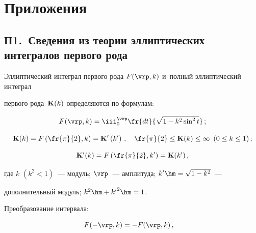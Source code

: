 {\small



\section*{\raggedleft Приложения}





\subsection*{П1.\ Сведения из теории эллиптических интегралов первого рода}



Эллиптический интеграл первого рода $F(\vrp,k)$ и~полный эллиптический интеграл 

первого рода~${\mathbf{K}}(k)$ определяются по формулам:

\begin{equation*}

F(\vrp,k) = \iii_0^\vrp \fr{dt}{\sqrt{1-k^2 \sin^2 t}}\,;


\end{equation*}

    \begin{equation*}

    \bK(k)= F\left(\fr{\pi}{2}, k\right) = \bK'\left(k'\right)\,,\quad 

    \fr{\pi}{2} \le \bK (k) \le \infty \enskip (0\le k\le 1)\,;


    \end{equation*}

\begin{equation*}

\bK'(k) = F\left( \fr{\pi}{2}, k'\right) = \bK(k')\,,


\end{equation*}

где $k$ $(k^2<1)$~--- модуль; $\vrp$~--- амплитуда; $k'\hm=\sqrt{1-k^2}$~--- 

дополнительный модуль; $k^2 \hm+ {k'}^2 \hm=1$.



Преобразование интервала:

\begin{equation*}

F(-\vrp, k) =-F(\vrp,k)\,,\quad 


\end{equation*}}
